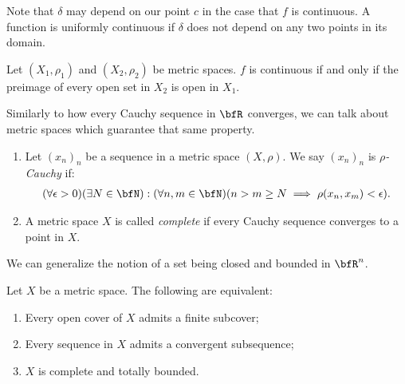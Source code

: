     Note that $\delta$ may depend on our point $c$ in the case that $f$ is continuous. A function is uniformly continuous if $\delta$ does not depend on any two points in its domain.

    \begin{proposition}
        Let $(X_1,\rho_1)$ and $(X_2,\rho_2)$ be metric spaces. $f$ is continuous if and only if the preimage of every open set in $X_2$ is open in $X_1$.
    \end{proposition}

    Similarly to how every Cauchy sequence in $\bfR$ converges, we can talk about metric spaces which guarantee that same property.

    \begin{definition}
        \phantom{a}
        \begin{enumerate}[label = (\arabic*),itemsep=1pt,topsep=3pt]
            \item Let $(x_n)_n$ be a sequence in a metric space $(X,\rho)$. We say $(x_n)_n$ is \textit{$\rho$-Cauchy} if:
                \begin{equation*}
                \begin{split}
                    (\forall \epsilon > 0)(\exists N \in \bfN):(\forall n,m \in \bfN)(n > m \geq N \implies \rho(x_n,x_m) < \epsilon).
                \end{split}
                \end{equation*}
            \item A metric space $X$ is called \textit{complete} if every Cauchy sequence converges to a point in $X$.
        \end{enumerate}
    \end{definition}

    We can generalize the notion of a set being closed and bounded in $\bfR^n$.

    \begin{proposition}
        Let $X$ be a metric space. The following are equivalent:
            \begin{enumerate}[label = (\arabic*),itemsep=1pt,topsep=3pt]
                \item Every open cover of $X$ admits a finite subcover;
                \item Every sequence in $X$ admits a convergent subsequence;
                \item $X$ is complete and totally bounded.
            \end{enumerate}
    \end{proposition}

